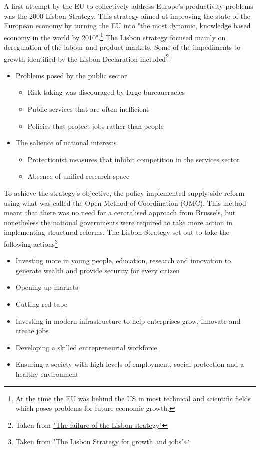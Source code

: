 \documentclass{tufte-handout}
\begin{document}
A first attempt by the EU to collectively address Europe's productivity problems was the 2000 Lisbon Strategy.
This strategy aimed at improving the state of the European economy by turning the EU into "the most dynamic, knowledge based economy in the world by 2010".\footnote{At the time the EU was behind the US in most technical and scientific fields which poses problems for future economic growth.} 
The Lisbon strategy focused mainly on deregulation of the labour and product markets.
Some of the impediments to growth identified by the Lisbon Declaration included\footnote{Taken from \href{http://voxeu.org/article/failure-lisbon-strategy}{"The failure of the Lisbon strategy"}}
\begin{itemize}
  \item Problems posed by the public sector
  \begin{itemize}
    \item Risk-taking was discouraged by large bureaucracies
    \item Public services that are often inefficient
    \item Policies that protect jobs rather than people
  \end{itemize}
  \item The salience of national interests
  \begin{itemize}
    \item Protectionist measures that inhibit competition in the services sector
    \item Absence of unified research space
  \end{itemize}
\end{itemize}

To achieve the strategy's objective, the policy implemented supply-side reform using what was called the Open Method of Coordination (OMC).
This method meant that there was no need for a centralised approach from Brussels, but nonetheless the national governments were required to take more action in implementing structural reforms. 
The Lisbon Strategy set out to take the following actions\footnote{Taken from \href{http://cordis.europa.eu/programme/rcn/843_en.html}{"The Lisbon Strategy for growth and jobs"}}
\begin{itemize}
  \item Investing more in young people, education, research and innovation to generate wealth and provide security for every citizen
  \item Opening up markets
  \item Cutting red tape
  \item Investing in modern infrastructure to help enterprises grow, innovate and create jobs
  \item Developing a skilled entrepreneurial workforce
  \item Ensuring a society with high levels of employment, social protection and a healthy environment
\end{itemize}
\end{document}
